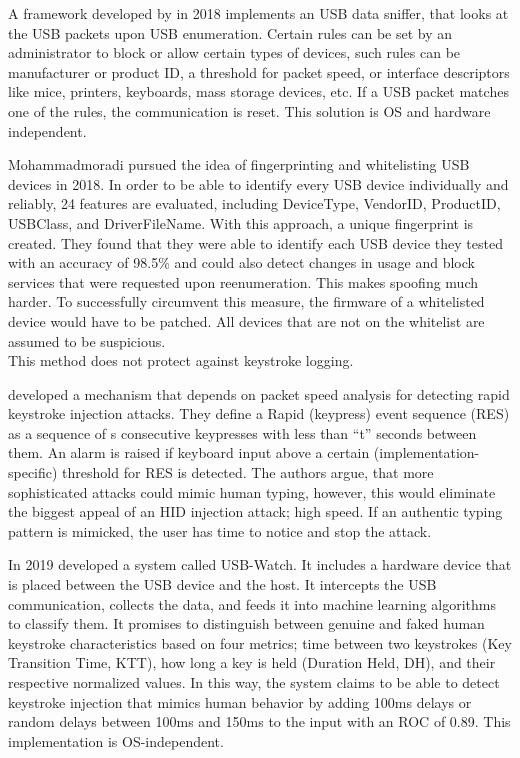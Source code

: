 A framework developed by \cite{erdinOSIndependentHardwareAssisted2018} in 2018 implements an USB data sniffer, that looks at the USB packets upon USB enumeration. Certain rules can be set by an administrator to block or allow certain types of devices, such rules can be manufacturer or product ID, a threshold for packet speed, or interface descriptors like mice, printers, keyboards, mass storage devices, etc. If a USB packet matches one of the rules, the communication is reset. This solution is OS and hardware independent. 

Mohammadmoradi \cite{mohammadmoradiMakingWhitelistingBasedDefense2018} pursued the idea of fingerprinting and whitelisting USB devices in 2018. In order to be able to identify every USB device individually and reliably, 24 features are evaluated, including DeviceType, VendorID, ProductID, USBClass, and DriverFileName. With this approach, a unique fingerprint is created. They found that they were able to identify each USB device they tested with an accuracy of 98.5\%  and could also detect changes in usage and block services that were requested upon reenumeration. This makes spoofing much harder. To successfully circumvent this measure, the firmware of a whitelisted device would have to be patched. All devices that are not on the whitelist are assumed to be suspicious. \\
This method does not protect against keystroke logging. 

\cite{neunerUSBlockBlockingUSBBased2018} developed a mechanism that depends on packet speed analysis for detecting rapid keystroke injection attacks. They define a Rapid (keypress) event sequence (RES) as a sequence of s consecutive keypresses with less than ``t'' seconds between them. An alarm is raised if keyboard input above a certain (implementation-specific) threshold for RES is detected. The authors argue, that more sophisticated attacks could mimic human typing, however, this would eliminate the biggest appeal of an HID injection attack; high speed. If an authentic typing pattern is mimicked, the user has time to notice and stop the attack.

In 2019 \cite{denneyUSBWatchDynamicHardwareAssisted2019} developed a system called USB-Watch. It includes a hardware device that is placed between the USB device and the host. It intercepts the USB communication, collects the data, and feeds it into machine learning algorithms to classify them. It promises to distinguish between genuine and faked human keystroke characteristics based on four metrics; time between two keystrokes (Key Transition Time, KTT), how long a key is held (Duration Held, DH), and their respective normalized values. In this way, the system claims to be able to detect keystroke injection that mimics human behavior by adding 100ms delays or random delays between 100ms and 150ms to the input with an ROC of 0.89. This implementation is OS-independent.


